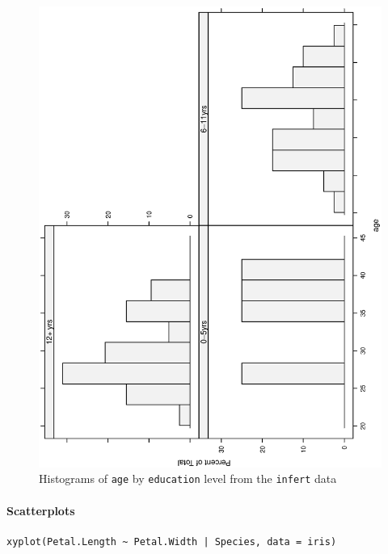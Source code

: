 \documentclass[captions=tableheading]{scrbook}
\begin{document}
\begin{figure}[th]
    \includegraphics[angle=270, totalheight=4in]{img/histograms-lattice.ps}
    \caption[Histograms of \texttt{age} by \texttt{education} level]{Histograms of \texttt{age} by \texttt{education} level from the \texttt{infert} data}
    \label{fig:histograms-lattice}
  \end{figure}



\paragraph*{Scatterplots}


\begin{verbatim}
xyplot(Petal.Length ~ Petal.Width | Species, data = iris)
\end{verbatim}
\end{document}
